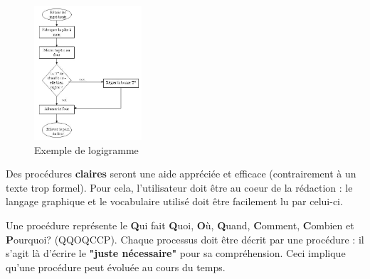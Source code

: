 \begin{figure}[!h] %
\begin{center}\includegraphics[height=5cm]{logigramme.jpg}\end{center}
\caption{Exemple de logigramme}
\end{figure} %
\par Des procédures \textbf{claires} seront une aide appréciée et efficace (contrairement à un texte trop formel). Pour cela, l'utilisateur doit
être au coeur de la rédaction : le langage graphique et le vocabulaire utilisé doit être facilement lu par celui-ci.\\
\par Une procédure représente le \textbf{Q}ui fait \textbf{Q}uoi, \textbf{O}ù, \textbf{Q}uand, \textbf{C}omment, \textbf{C}ombien et \textbf{P}ourquoi? (QQOQCCP).
Chaque processus doit être décrit par une procédure : il s'agit là d'écrire le \textbf{"juste nécessaire"} pour sa compréhension. Ceci implique
qu'une procédure peut évoluée au cours du temps.
